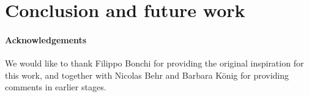 \section{Conclusion and future work}





\paragraph{Acknowledgements}
We would like to thank Filippo Bonchi for providing the original inspiration for this work, and together with Nicolas Behr and Barbara König for providing comments in earlier stages.
